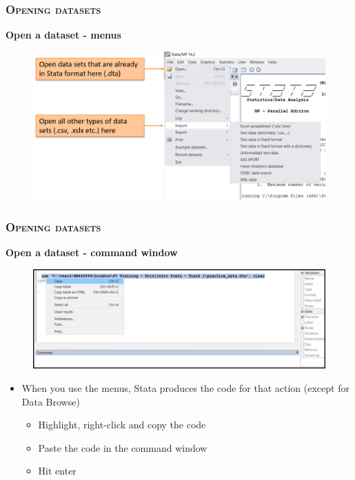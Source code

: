 \documentclass[10pt]{beamer}
\begin{document}
		\begin{frame}
			\frametitle{\textsc{Opening datasets}}
			\begin{center}
				\Large\textbf{Open a dataset - menus}
			\end{center}
			 \begin{figure}[H] 
				\centering
				\includegraphics[width=0.9\linewidth]{open_dataset_menu}
			\end{figure}
		\end{frame}

	\begin{frame}
		\frametitle{\textsc{Opening datasets}}
		\begin{center}
			\Large\textbf{Open a dataset - command window}
		\end{center}
		\begin{figure}[H] 
			\centering
			\includegraphics[width=0.9\linewidth]{open_dataset_command}
		\end{figure}
		\begin{itemize}
			\item When you use the menus, Stata produces the code for that action (except for Data Browse)
			\begin{itemize}
				\item Highlight, right-click and copy the code
				\item Paste the code in the command window
				\item Hit enter
			\end{itemize}
		\end{itemize}
	\end{frame}
\end{document}
